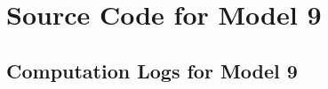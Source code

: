 % 

%     

\newpage
\section{Source Code for Model 9}


\newpage
\begin{landscape}
    \section{Computation Logs for Model 9}
    
\end{landscape}

% 

%     




